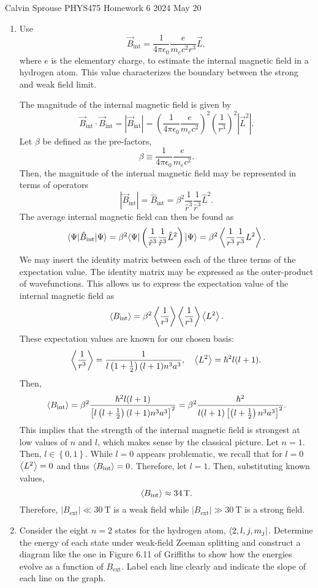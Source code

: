 \documentclass[a4paper, 12pt]{config/homework}
\begin{document}
\noindent
Calvin Sprouse \hfill PHYS475 Homework 6 \hfill 2024 May 20
\bigskip

\begin{enumerate}
\item Use
\[\vec{B}_\text{int} = \frac{1}{4\pi \epsilon_0} \frac{e}{m_e c^2 r^3} \vec{L},\]
where \(e\) is the elementary charge, to estimate the internal magnetic field in a hydrogen atom. This value characterizes the boundary between the strong and weak field limit.

\bigskip
The magnitude of the internal magnetic field is given by
\[\vec{B}_\text{int}\cdot\vec{B}_\text{int}
= \left|\vec{B}_\text{int}\right|
= \left(\frac{1}{4\pi\epsilon_0}\frac{e}{m_e c^2}\right)^2\left(\frac{1}{r^3}\right)^2 \left|\vec{L}^2\right|.\]
Let \(\beta\) be defined as the pre-factors,
\[\beta \equiv \frac{1}{4\pi\epsilon_0}\frac{e}{m_e c^2}.\]
Then, the magnitude of the internal magnetic field may be represented in terms of operators
\[\left|\vec{B}_\text{int}\right|
= \hat{B}_\text{int} = \beta^2\frac{1}{\hat{r}^3}\frac{1}{\hat{r}^3}\hat{L}^2.\]
The average internal magnetic field can then be found as
\[\bra*{\Psi}\hat{B}_\text{int}\ket*{\Psi}
= \beta^2\bra*{\Psi}\left(\frac{1}{\hat{r}^3}\frac{1}{\hat{r}^3}\hat{L}^2\right)\ket*{\Psi} = \beta^2 \expval{\frac{1}{r^3}\frac{1}{r^3}L^2}.\]
We may insert the identity matrix between each of the three terms of the expectation value. The identity matrix may be expressed as the outer-product of wavefunctions. This allows us to express the expectation value of the internal magnetic field as
\[\expval{B_\text{int}} = \beta^2\expval{\frac{1}{r^3}}\expval{\frac{1}{r^3}}\expval{L^2}.\]
These expectation values are known for our chosen basis:
\[\expval{\frac{1}{r^3}} = \frac{1}{l\left(1+\frac{1}{2}\right)(l+1)n^3a^3}, \quad
\expval{L^2} = \hbar^2l(l+1).\]
Then,
\[\expval{B_\text{int}} = \beta^2\frac{\hbar^2l(l+1)}{\left[l\left(l+\frac{1}{2}\right)(l+1)n^3a^3\right]^2} = \beta^2 \frac{\hbar^2}{l(l+1)\left[\left(l+\frac{1}{2}\right)n^3a^3\right]^2}.\]
This implies that the strength of the internal magnetic field is strongest at low values of \(n\) and \(l\), which makes sense by the classical picture. Let \(n=1\). Then, \(l\in\left\{0, 1\right\}\). While \(l=0\) appears problematic, we recall that for \(l=0\) \(\expval{L^2}=0\) and thus \(\expval{B_\text{int}}=0\). Therefore, let \(l=1\). Then, substituting known values,
\[\expval{B_\text{int}} \approx \qty{34}{\tesla}.\]
Therefore, \(\left|B_\text{ext}\right|\ll \qty{30}{\tesla}\) is a weak field while \(\left|B_\text{ext}\right| \gg \qty{30}{\tesla}\) is a strong field.


\pagebreak
\item Consider the eight \(n=2\) states for the hydrogen atom, \(\bra*{2, l, j, m_j}\). Determine the energy of each state under weak-field Zeeman splitting and construct a diagram like the one in Figure 6.11 of Griffiths to show how the energies evolve as a function of \(B_\text{ext}\). Label each line clearly and indicate the slope of each line on the graph.



\end{enumerate}
\end{document}
